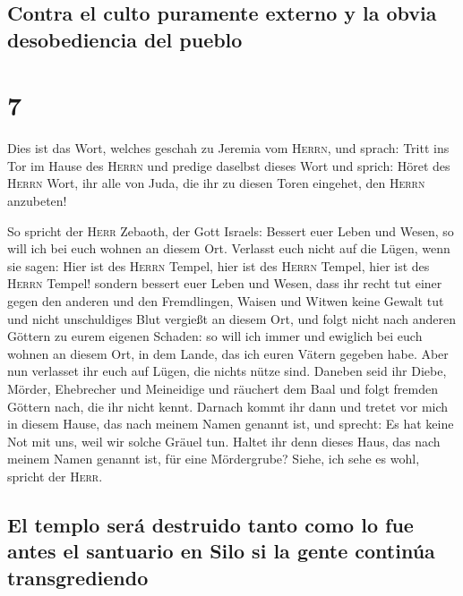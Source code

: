 \hypertarget{contra-el-culto-puramente-externo-y-la-obvia-desobediencia-del-pueblo}{%
\subsection{Contra el culto puramente externo y la obvia desobediencia
del
pueblo}\label{contra-el-culto-puramente-externo-y-la-obvia-desobediencia-del-pueblo}}

\hypertarget{section-6}{%
\section{7}\label{section-6}}

 Dies ist das Wort, welches geschah zu Jeremia vom
\textsc{Herrn}, und sprach:  Tritt ins Tor im Hause des
\textsc{Herrn} und predige daselbst dieses Wort und sprich: Höret des
\textsc{Herrn} Wort, ihr alle von Juda, die ihr zu diesen Toren
eingehet, den \textsc{Herrn} anzubeten!

 So spricht der \textsc{Herr} Zebaoth, der Gott Israels:
Bessert euer Leben und Wesen, so will ich bei euch wohnen an diesem Ort.
 Verlasst euch nicht auf die Lügen, wenn sie sagen: Hier
ist des \textsc{Herrn} Tempel, hier ist des \textsc{Herrn} Tempel, hier
ist des \textsc{Herrn} Tempel!  sondern bessert euer Leben
und Wesen, dass ihr recht tut einer gegen den anderen  und
den Fremdlingen, Waisen und Witwen keine Gewalt tut und nicht
unschuldiges Blut vergießt an diesem Ort, und folgt nicht nach anderen
Göttern zu eurem eigenen Schaden:  so will ich immer und
ewiglich bei euch wohnen an diesem Ort, in dem Lande, das ich euren
Vätern gegeben habe.  Aber nun verlasset ihr euch auf
Lügen, die nichts nütze sind.  Daneben seid ihr Diebe,
Mörder, Ehebrecher und Meineidige und räuchert dem Baal und folgt
fremden Göttern nach, die ihr nicht kennt.  Darnach kommt
ihr dann und tretet vor mich in diesem Hause, das nach meinem Namen
genannt ist, und sprecht: Es hat keine Not mit uns, weil wir solche
Gräuel tun.  Haltet ihr denn dieses Haus, das nach meinem
Namen genannt ist, für eine Mördergrube? Siehe, ich sehe es wohl,
spricht der \textsc{Herr}.

\hypertarget{el-templo-seruxe1-destruido-tanto-como-lo-fue-antes-el-santuario-en-silo-si-la-gente-continuxfaa-transgrediendo}{%
\subsection{El templo será destruido tanto como lo fue antes el
santuario en Silo si la gente continúa
transgrediendo}\label{el-templo-seruxe1-destruido-tanto-como-lo-fue-antes-el-santuario-en-silo-si-la-gente-continuxfaa-transgrediendo}}

